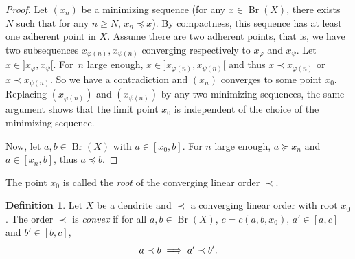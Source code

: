 \documentclass[JEP,XML,SOM,Unicode,NoFloatCountersInSection]{cedram}
\newcommand\implique{\mathchoice{\implies}{\Rightarrow}{\Rightarrow}{\Rightarrow}}
\theoremstyle{plain}
\theoremstyle{definition}
\newtheorem{defn}[thm]{Definition}
\DeclareMathOperator{\Br}{Br}
\begin{document}
\begin{proof} Let $(x_n)$ be a minimizing sequence (\ie for any $x\in\Br(X)$, there exists~$N$ such that for any $n\geq N$, $x_n\preceq x$). By compactness, this sequence has at least one adherent point in $X$. Assume there are two adherent points, that is, we have two subsequences $x_{\varphi(n)},x_{\psi(n)}$ converging respectively to $x_\varphi$ and $x_\psi$. Let $x\in{}]x_\varphi,x_\psi[$. For~$n$ large enough, $x\in{}]x_{\varphi(n)},x_{\psi(n)}[$ and thus $x\prec x_{\varphi(n)}$ or $x\prec x_{\psi(n)}$. So we have a contradiction and $(x_n)$ converges to some point $x_0$. Replacing $(x_{\varphi(n)})$ and $(x_{\psi(n)})$ by any two minimizing sequences, the same argument shows that the limit point $x_0$ is independent of the choice of the minimizing sequence.

Now, let $a,b\in \Br(X)$ with $a\in[x_0,b]$. For $n$ large enough, $a\succeq x_n$ and $a\in[x_n,b]$, thus $a\preceq b$.
\end{proof}

The point $x_0$ is called the \emph{root} of the converging linear order $\prec$.
\begin{defn} Let $X$ be a dendrite and $\prec$ a converging linear order with root $x_0$. The order $\prec$ is \emph{convex} if for all $a,b\in\Br(X)$, $c=c(a,b,x_0)$, $a'\in[a,c]$ and $b'\in[b,c]$,\[
a\prec b\implique a'\prec b'.
\]
\end{defn}
\end{document}
